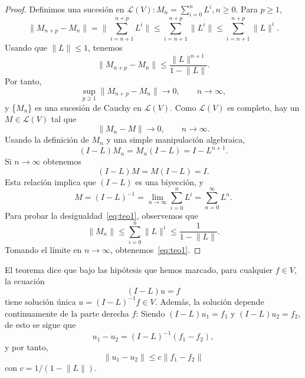 \begin{proof}
	Definimos una sucesión en $\mathcal{L}(V): M_n = \sum_{i=0}^{n}L^i, n \geqslant 0$. Para $p \geqslant 1$, 
	\begin{equation}
		\lVert M_{n+p} - M_n \rVert = \lVert \sum_{i=n+1}^{n+p}L^i \rVert \leqslant \sum_{i=n+1}^{n+p} \lVert L^i \rVert \leqslant \sum_{i=n+1}^{n+p} \lVert L \rVert^i.
	\end{equation}
	Usando que $\lVert L \rVert \leq 1$, tenemos
	\begin{equation}
		 \lVert M_{n+p} - M_n \rVert \leqslant \dfrac{\lVert L \rVert^{n+1}}{1 - \lVert L \rVert}.
	\end{equation}
	Por tanto,
	\begin{equation}
		\sup_{p \geqslant 1} \lVert M_{n+p} - M_n \rVert \rightarrow 0, \qquad n \rightarrow \infty,
	\end{equation}
	y \{$M_n$\} es una sucesión de Cauchy en $\mathcal{L}(V)$. Como $\mathcal{L}(V)$ es completo, hay un $M \in \mathcal{L}(V)$ tal que
	\begin{equation}
		\lVert M_{n} - M \rVert \rightarrow 0, \qquad n \rightarrow \infty.
	\end{equation}
	Usando la definición de $M_n$ y una simple manipulación algebraica,
	\begin{equation}
		(I-L)M_n = M_n(I-L) = I - L^{n+1}.
	\end{equation}
	Si $n \rightarrow \infty$ obtenemos
	\begin{equation}
		(I-L)M = M(I-L) = I.
	\end{equation}
	Esta relación implica que $(I-L)$ es una biyección, y
	\begin{equation}
		M = (I-L)^{-1} = \lim_{n \rightarrow \infty}\sum_{i=0}^{n}L^i = \sum_{n=0}^{\infty}L^n.
	\end{equation}
	Para probar la desigualdad~\eqref{eq:teo1}, observemos que
	\begin{equation}
		\lVert M_{n} \rVert \leqslant \sum_{i=0}^{n}\lVert L \rVert^i \leqslant \dfrac{1}{1 - \lVert L \rVert}.
	\end{equation}
	Tomando el límite en $n \rightarrow \infty$, obtenemos~\eqref{eq:teo1}.
\end{proof}
\begin{observacion}
	El teorema dice que bajo las hipótesis que hemos marcado, para cualquier $f \in V$, la ecuación
	\begin{equation}\label{eq:teo2}
		(I-L)u = f
	\end{equation}
	tiene solución única $u = (I-L)^{-1}f \in V$. Además, la solución depende continuamente de la parte derecha $f$: Siendo $(I-L)u_1 = f_1$ y $(I-L)u_2 = f_2$, de esto se sigue que
	\begin{equation}
		u_1 - u_2 = (I-L)^{-1}(f_1 - f_2),
	\end{equation}
	y por tanto,
	\begin{equation}
		\lVert u_1 - u_2 \rVert \leqslant c \lVert f_1 - f_2 \rVert
	\end{equation}
	con $c = 1/(1 - \lVert L \rVert)$.
\end{observacion}
